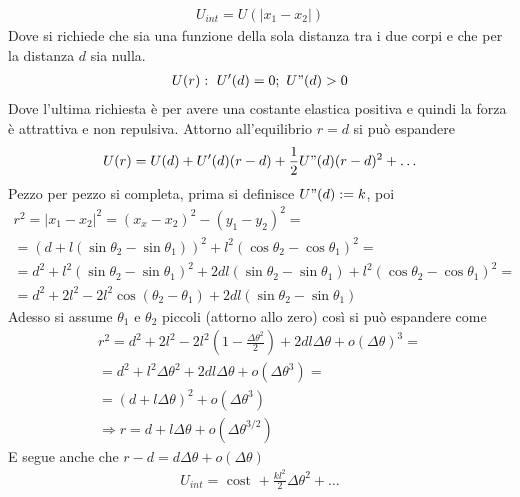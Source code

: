 \documentclass[Main.tex]{subfiles}
\begin{document}
\begin{tema}
	\begin{gather}
		U_{int} = U(|x_1-x_2|)
	\end{gather}
	Dove si richiede che sia una funzione della sola distanza tra i due corpi e che per la distanza $d$ sia nulla. 
	\begin{gather}
		U(r): \ U'(d) =0; \ U"(d)>0
	\end{gather}
	Dove l'ultima richiesta è per avere una costante elastica positiva e quindi la forza è attrattiva e non repulsiva. Attorno all'equilibrio $r=d$ si può espandere
	\begin{gather}
		U(r) =U(d) + U'(d) (r-d) + \frac{1}{2} U"(d) (r-d)^2+ \dots
	\end{gather}
	Pezzo per pezzo si completa, prima si definisce $U"(d):= k$, poi
	\begin{gather*}
		r^2 =|x_1-x_2|^2 = (x_x-x_2)^2-(y_1-y_2)^2=\\
		=(d+ l(\sin \theta_2 - \sin \theta_1))^2 + l^2 ( \cos \theta _2 - \cos \theta_1)^2=\\
		= d^2+ l^2 ( \sin \theta_2 - \sin \theta_1)^2 + 2dl (\sin \theta_2- \sin \theta_1) + l^2 (\cos \theta_2 - \cos \theta_1)^2 =\\
		=d^2 + 2l^2 - 2l^2 \cos (\theta_2 - \theta_1) + 2dl (\sin \theta_2 - \sin \theta_1)
	\end{gather*}
	Adesso si assume $\theta_1$ e $\theta_2$ piccoli (attorno allo zero) così si può espandere come
	\begin{gather}
		r^2 = d^2 + 2l^2 - 2l^2 \left(1- \frac{\Delta \theta^2}{2}\right) + 2dl \Delta \theta + o(\Delta \theta)^3=\\
		=d^2 + l^2 \Delta \theta^2 + 2dl \Delta \theta + o (\Delta \theta^3)=\\
		= (d+l\Delta \theta)^2 + o (\Delta \theta^3)\\
		\Rightarrow \boxed{r=d+l\Delta \theta + o(\Delta \theta^{3/2})}
	\end{gather}
	E segue anche che $r-d= d \Delta \theta + o(\Delta \theta)$
	\begin{gather}
		U_{int} = \text{ cost } + \frac{kl^2}{2} \Delta \theta^2+ \dots
	\end{gather}
	

\end{tema}
\end{document}
